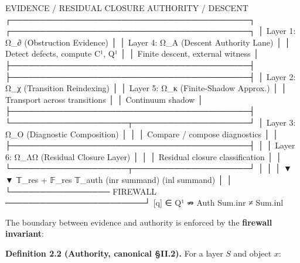 \documentclass[
  10pt,
]{article}
\newenvironment{Shaded}{}{}
\newcommand{\NormalTok}[1]{#1}
\begin{document}
\begin{Shaded}
\begin{Highlighting}[]
\NormalTok{  EVIDENCE / RESIDUAL CLOSURE                         AUTHORITY / DESCENT}
\NormalTok{  ┌─────────────────────────────────────────┐         ┌─────────────────────────────────────────┐}
\NormalTok{  │ Layer 1: Ω\_∂ (Obstruction Evidence)     │         │ Layer 4: Ω\_A (Descent Authority Lane)   │}
\NormalTok{  │  Detect defects, compute C¹, Q¹         │         │  Finite descent, external witness       │}
\NormalTok{  ├─────────────────────────────────────────┤         ├─────────────────────────────────────────┤}
\NormalTok{  │ Layer 2: Ω\_χ (Transition Reindexing)    │         │ Layer 5: Ω\_κ (Finite{-}Shadow Approx.)    │}
\NormalTok{  │  Transport across transitions           │         │  Continuum shadow                       │}
\NormalTok{  ├─────────────────────────────────────────┤         └────────────────────┬────────────────────┘}
\NormalTok{  │ Layer 3: Ω\_O (Diagnostic Composition)   │                              │}
\NormalTok{  │  Compare / compose diagnostics          │                              │}
\NormalTok{  ├─────────────────────────────────────────┤                              │}
\NormalTok{  │ Layer 6: Ω\_ΛΩ (Residual Closure Layer)  │                              │}
\NormalTok{  │  Residual closure classification        │                              │}
\NormalTok{  └────────────────────┬────────────────────┘                              │}
\NormalTok{                       │                                                   │}
\NormalTok{                       ▼                                                   ▼}
\NormalTok{                𝕋\_res + 𝔽\_res                                           𝕋\_auth}
\NormalTok{                (inr summand)                                           (inl summand)}
\NormalTok{                       │                                                   │}
\NormalTok{                       └───────────────── FIREWALL ────────────────────────┘}
\NormalTok{                                      [q] ∈ Q¹ ⇏ Auth}
\NormalTok{                                  Sum.inr ≠ Sum.inl}
\end{Highlighting}
\end{Shaded}

The boundary between evidence and authority is enforced by the \textbf{firewall invariant}:

\textbf{Definition 2.2 (Authority, canonical §II.2).} For a layer \protect\hypertarget{math-E0030-0038}{}{\(S\)} and object \protect\hypertarget{math-E0031-0039}{}{\(x\)}:
\end{document}
